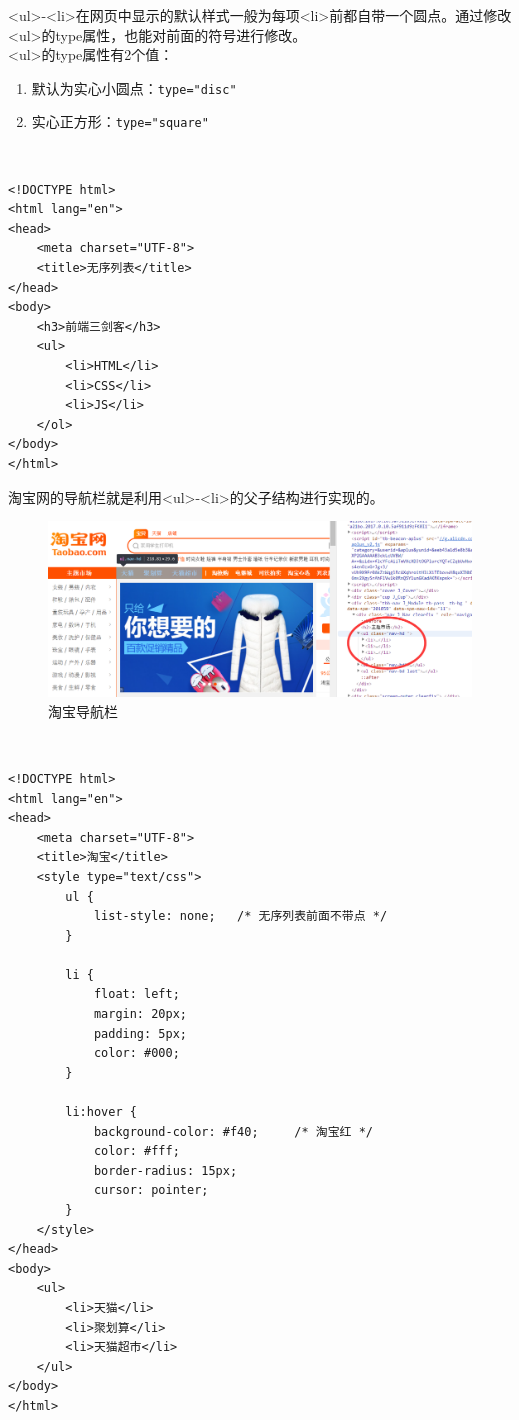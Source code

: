 <ul>-<li>在网页中显示的默认样式一般为每项<li>前都自带一个圆点。通过修改<ul>的type属性，也能对前面的符号进行修改。\\

<ul>的type属性有2个值：

\begin{enumerate}
	\item 默认为实心小圆点：\lstinline|type="disc"|
	\item 实心正方形：\lstinline|type="square"|
\end{enumerate}

\vspace{0.5cm}

\\

\begin{lstlisting}[style=htmlcssjs]
<!DOCTYPE html>
<html lang="en">
<head>
    <meta charset="UTF-8">
    <title>无序列表</title>
</head>
<body>
    <h3>前端三剑客</h3>
    <ul>
        <li>HTML</li>
        <li>CSS</li>
        <li>JS</li>
    </ol>
</body>
</html>
\end{lstlisting}

淘宝网的导航栏就是利用<ul>-<li>的父子结构进行实现的。

\begin{figure}[H]
	\centering
	\includegraphics[scale=0.5]{img/C3/3-2/2.png}
	\caption{淘宝导航栏}
\end{figure}

\\

\begin{lstlisting}[style=htmlcssjs]
<!DOCTYPE html>
<html lang="en">
<head>
    <meta charset="UTF-8">
    <title>淘宝</title>
    <style type="text/css">
        ul {
            list-style: none;   /* 无序列表前面不带点 */
        }

        li {
            float: left;
            margin: 20px;
            padding: 5px;
            color: #000;
        }

        li:hover {
            background-color: #f40;     /* 淘宝红 */
            color: #fff;
            border-radius: 15px;
            cursor: pointer;
        }
    </style>
</head>
<body>
    <ul>
        <li>天猫</li>
        <li>聚划算</li>
        <li>天猫超市</li>
    </ul>
</body>
</html>
\end{lstlisting}

